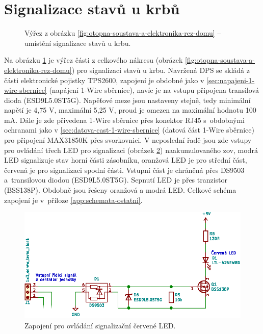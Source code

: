 \section{Signalizace stavů u krbů}
\begin{figure}[H]
   \centering
    \def\svgwidth{0.3\columnwidth}
    
    \caption[Umístění signalizace stavů u krbu.]{Výřez z obrázku \ref{fig:otopna-soustava-a-elektronika-rez-domu} – umístění signalizace stavů u krbu.}
    \label{fig:vyrez-krb-signalizace}
\end{figure}

Na obrázku \ref{fig:vyrez-krb-signalizace} je výřez části z celkového nákresu (obrázek \ref{fig:otopna-soustava-a-elektronika-rez-domu}) pro signalizaci stavů u krbu. Navržená DPS se skládá z části elektronické pojistky TPS2600, zapojení je obdobné jako v \ref{sec:napajeni-1-wire-sbernice} (napájení 1-Wire sběrnice), navíc je na vstupu připojena transilová dioda (ESD9L5.0ST5G). Napěťové meze jsou nastaveny stejně, tedy minimální napětí je 4,75 V, maximální 5,25 V, proud je omezen na maximální hodnotu 100 mA. Dále je zde přivedena 1-Wire sběrnice přes konektor RJ45 s~obdobnými ochranami jako v \ref{sec:datova-cast-1-wire-sbernice} (datová část 1-Wire sběrnice) pro připojení MAX31850K přes svorkovnici. V neposlední řadě jsou zde vstupy pro ovládání třech LED pro signalizaci (obrázek \ref{fig:led-indikace}) naakumulovaného \acrshort{zov}, modrá LED signalizuje stav horní části zásobníku, oranžová LED je pro střední část, červená je pro signalizaci spodní části. Vstupní část je chráněná přes DS9503 a~transilovou diodou (ESD9L5.0ST5G). Sepnutí LED je přes tranzistor (BSS138P). Obdobně jsou řešeny oranžová a modrá LED. Celkové schéma zapojení je v~příloze \ref{app:schemata-ostatni}.

\begin{figure}[H]
    \centering
    \includegraphics[width=\textwidth]{images/svg/kicad/led-indikace.eps}
    \caption{Zapojení pro ovládání signalizační červené LED.}
    \label{fig:led-indikace}
\end{figure}




